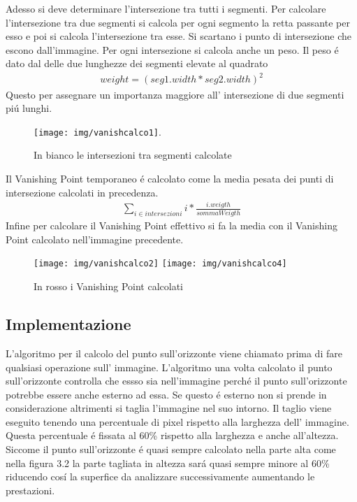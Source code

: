 		Adesso si deve determinare l'intersezione tra tutti i segmenti. Per calcolare l'intersezione tra due segmenti si calcola per ogni segmento la retta passante per esso e poi si calcola l'intersezione tra esse. Si scartano i punto di intersezione che escono dall'immagine. Per ogni intersezione si calcola anche un peso. Il peso \'e dato dal delle due lunghezze dei segmenti elevate al quadrato
		\begin{align*}
			weight = (seg1.width * seg2.width)^{2}
		\end{align*}
		Questo per assegnare un importanza maggiore all' intersezione di due segmenti pi\'u lunghi.
		\begin{figure}[!ht]
			\centering
			\texttt{[image: img/vanishcalco1]}.
			\caption{In bianco le intersezioni tra segmenti calcolate}
		\end{figure}
		Il Vanishing Point temporaneo \'e calcolato come la media pesata dei punti di intersezione calcolati in precedenza.
		\begin{align*}
			\sum\limits_{i \in intersezioni} i * \frac{i.weigth}{sommaWeigth}
		\end{align*}
		Infine per calcolare il Vanishing Point effettivo si fa la media con il Vanishing Point calcolato nell'immagine precedente.

		\begin{figure}[!ht]
			\centering
			\texttt{[image: img/vanishcalco2]}
			\hspace{7mm}
			\texttt{[image: img/vanishcalco4]}
			\caption{In rosso i Vanishing Point calcolati}
		\end{figure}

	\subsection{Implementazione}
		L'algoritmo per il calcolo del punto sull'orizzonte viene chiamato prima di fare qualsiasi operazione sull' immagine. L'algoritmo una volta calcolato il punto sull'orizzonte controlla che essso sia nell'immagine perch\'e il punto sull'orizzonte potrebbe essere anche esterno ad essa. Se questo \'e esterno non si prende in considerazione altrimenti si taglia l'immagine nel suo intorno. Il taglio viene eseguito tenendo una percentuale di pixel rispetto alla larghezza dell' immagine. Questa percentuale \'e fissata al 60\% rispetto alla larghezza e anche all'altezza. Siccome il punto sull'orizzonte \'e quasi sempre calcolato nella parte alta come nella figura 3.2 la parte tagliata in altezza sar\'a quasi sempre minore al 60\% riducendo cos\'i la superfice da analizzare successivamente aumentando le prestazioni. 

